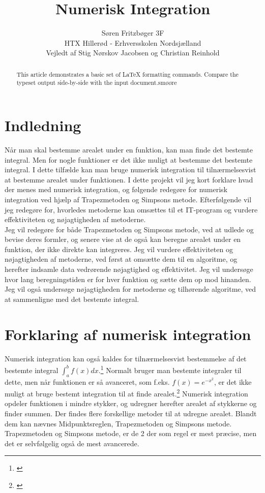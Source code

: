 \documentclass[12pt]{article}
\numberwithin{equation}{section}
\begin{document}
\title{Numerisk Integration}
\author{Søren Fritzbøger 3F\\
HTX Hillerød - Erhversskolen Nordsjælland\\
Vejledt af Stig Nørskov Jacobsen og Christian Reinhold}
\renewcommand{\today}{2. Februar 2015}
\maketitle

\begin{abstract}
This article demonstrates a basic set of LaTeX formatting commands.
Compare the typeset output side-by-side with the input document.smøøre
\end{abstract}
\newpage
\tableofcontents
\newpage
\section{Indledning}
Når man skal bestemme arealet under en funktion, kan man finde det bestemte integral. Men for nogle funktioner er det ikke muligt at bestemme det bestemte integral. I dette tilfælde kan man bruge numerisk integration til tilnærmelsesvist at bestemme arealet under funktionen. I dette projekt vil jeg kort forklare hvad der menes med numerisk integration, og følgende redegøre for numerisk integration ved hjælp af Trapezmetoden og Simpsons metode. Efterfølgende vil jeg redegøre for, hvorledes metoderne kan omsættes til et IT-program og vurdere effektiviteten og nøjagtigheden af metoderne.
\\
Jeg vil redegøre for både Trapezmetoden og Simpsons metode, ved at udlede og bevise deres formler, og senere vise at de også kan beregne arealet under en funktion, der ikke direkte kan integreres. Jeg vil vurdere effektiviteten og nøjagtigheden af metoderne, ved først at omsætte dem til en algoritme, og herefter indsamle data vedrørende nøjagtighed og effektivitet. Jeg vil undersøge hvor lang beregningstiden er for hver funktion og sætte dem op mod hinanden. Jeg vil også undersøge nøjagtigheden for metoderne og tilhørende algoritme, ved at sammenligne med det bestemte integral.

\section{Forklaring af numerisk integration}
Numerisk integration kan også kaldes for tilnærmelsesvist bestemmelse af det bestemte integral $\int_{a}^{b}f(x)dx$.\footnote{\cite{numeriskintegration}} Normalt bruger man bestemte integraler til dette, men når funktionen er så avanceret, som f.eks. $f(x)=e^{-x^2}$, er det ikke muligt at bruge bestemt integration til at finde arealet.\footnote{\cite{2012matA}} Numerisk integration opdeler funktionen i mindre stykker, og udregner herefter arealet af stykkerne og finder summen. Der findes flere forskellige metoder til at udregne arealet. Blandt dem kan nævnes Midpunktsreglen, Trapezmetoden og Simpsons metode. Trapezmetoden og Simpsons metode, er de 2 der som regel er mest præcise, men det er selvfølgelig også de mest avancerede.
\end{document}
